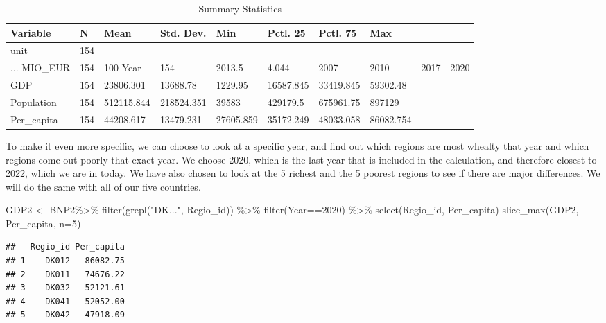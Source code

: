 \documentclass[
]{article}
\newenvironment{Shaded}{\begin{snugshade}}{\end{snugshade}}
\newcommand{\AttributeTok}[1]{\textcolor[rgb]{0.77,0.63,0.00}{#1}}
\newcommand{\DecValTok}[1]{\textcolor[rgb]{0.00,0.00,0.81}{#1}}
\newcommand{\FunctionTok}[1]{\textcolor[rgb]{0.00,0.00,0.00}{#1}}
\newcommand{\NormalTok}[1]{#1}
\newcommand{\OtherTok}[1]{\textcolor[rgb]{0.56,0.35,0.01}{#1}}
\newcommand{\SpecialCharTok}[1]{\textcolor[rgb]{0.00,0.00,0.00}{#1}}
\newcommand{\StringTok}[1]{\textcolor[rgb]{0.31,0.60,0.02}{#1}}
\begin{document}
\begin{table}

\caption{\label{tab:unnamed-chunk-3}Summary Statistics}
\centering
\begin{tabular}[t]{llllllll}
\toprule
Variable & N & Mean & Std. Dev. & Min & Pctl. 25 & Pctl. 75 & Max\\
\midrule
unit & 154 &  &  &  &  &  & \\
... MIO_EUR & 154 & 100%
Year & 154 & 2013.5 & 4.044 & 2007 & 2010 & 2017 & 2020\\
GDP & 154 & 23806.301 & 13688.78 & 1229.95 & 16587.845 & 33419.845 & 59302.48\\
Population & 154 & 512115.844 & 218524.351 & 39583 & 429179.5 & 675961.75 & 897129\\
\addlinespace
Per_capita & 154 & 44208.617 & 13479.231 & 27605.859 & 35172.249 & 48033.058 & 86082.754\\
\bottomrule
\end{tabular}
\end{table}

To make it even more specific, we can choose to look at a specific year,
and find out which regions are most whealty that year and which regions
come out poorly that exact year. We choose 2020, which is the last year
that is included in the calculation, and therefore closest to 2022,
which we are in today. We have also chosen to look at the 5 richest and
the 5 poorest regions to see if there are major differences. We will do
the same with all of our five countries.

\begin{Shaded}
\begin{Highlighting}[]
\NormalTok{GDP2 }\OtherTok{\textless{}{-}}\NormalTok{ BNP2}\SpecialCharTok{\%\textgreater{}\%}
  \FunctionTok{filter}\NormalTok{(}\FunctionTok{grepl}\NormalTok{(}\StringTok{"DK..."}\NormalTok{, Regio\_id)) }\SpecialCharTok{\%\textgreater{}\%}
  \FunctionTok{filter}\NormalTok{(Year}\SpecialCharTok{==}\DecValTok{2020}\NormalTok{) }\SpecialCharTok{\%\textgreater{}\%}
  \FunctionTok{select}\NormalTok{(Regio\_id, Per\_capita)}
\FunctionTok{slice\_max}\NormalTok{(GDP2, Per\_capita, }\AttributeTok{n=}\DecValTok{5}\NormalTok{)}
\end{Highlighting}
\end{Shaded}

\begin{verbatim}
##   Regio_id Per_capita
## 1    DK012   86082.75
## 2    DK011   74676.22
## 3    DK032   52121.61
## 4    DK041   52052.00
## 5    DK042   47918.09
\end{verbatim}
\end{document}
